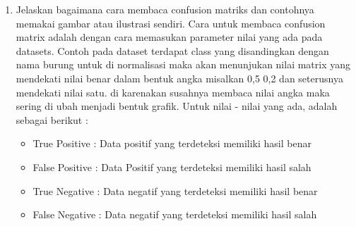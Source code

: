 \begin{enumerate}
\item Jelaskan bagaimana cara membaca confusion matriks dan contohnya memakai gambar atau ilustrasi sendiri.
Cara untuk membaca confusion matrix adalah dengan cara memasukan parameter nilai yang ada pada datasets. Contoh pada dataset terdapat class yang disandingkan dengan nama burung untuk di normalisasi maka akan menunjukan nilai matrix yang mendekati nilai benar dalam bentuk angka misalkan 0,5 0,2 dan seterusnya mendekati nilai satu. di karenakan susahnya membaca nilai angka maka sering di ubah menjadi bentuk grafik. Untuk nilai - nilai yang ada, adalah sebagai berikut : 
\begin{itemize}
    \item True Positive : Data positif yang terdeteksi memiliki hasil benar
    \item False Positive : Data Positif yang terdeteksi memiliki hasil salah
    \item True Negative : Data negatif yang terdeteksi memiliki hasil benar
    \item False Negative : Data negatif yang terdeteksi memiliki hasil salah
\end{itemize}
\begin{figure}[H]
    \centering

\end{figure}
\end{enumerate}
